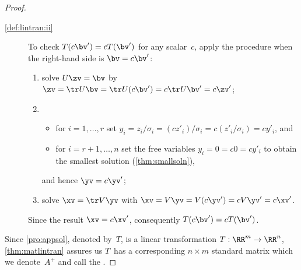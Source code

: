 \begin{proof}
\begin{description}
\item[\ref{def:lintran:ii}]  
To check \(T(c\bv')=cT(\bv')\) for any scalar~\(c\), apply the procedure when the right-hand side is \(\bv=c\bv'\):
\begin{enumerate}
\item solve \(U\zv=\bv\) by \(\zv=\tr U\bv=\tr U(c\bv')=c\tr U\bv'=c\zv'\);
\item \begin{itemize}
\item for \(i=1,\ldots,r\) set \(y_i=z_i/\sigma_i=(cz'_i)/\sigma_i=c(z'_i/\sigma_i)=cy'_i\), and
\item for \(i=r+1,\ldots,n\) set the free variables \(y_i=0=c0=cy'_i\) to obtain the smallest solution (\autoref{thm:smallsoln}),
\end{itemize}
and hence \(\yv=c\yv'\);
\item solve \(\xv=\tr V\yv\) with \(\xv=V\yv=V(c\yv')=cV\yv'=c\xv'\).
\end{enumerate}
Since the result \(\xv=c\xv'\), consequently \(T(c\bv')=cT(\bv')\).
\end{description}
Since \autoref{pro:appsol}, denoted by~\(T\), is a linear transformation \(T:\RR^m\to\RR^n\), \autoref{thm:matlintran} assures us \(T\)~has a corresponding \(n\times m\) standard matrix which we denote~\(A^+\) and call the .
\end{proof}




